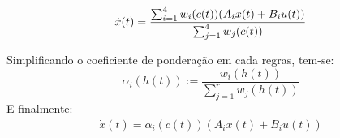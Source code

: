 \begin{align*}
	 \dot{x}(t) = \frac{\sum_{i=1}^{4}  w_i(c(t))(A_i  x(t) +  B_i  u(t))}{\sum_{j=1}^{4} w_j(c(t))} \vspace{0.5cm}
\end{align*}

Simplificando o coeficiente de ponderação em cada regras, tem-se:
\begin{equation*}
	\alpha_i (h(t)) := \frac{w_i(h(t))}{\sum_{j=1}^{r}w_j(h(t))}
\end{equation*}
E finalmente:
\begin{align} \label{eqModTakSug}
	 \dot{x}(t) = \alpha_i (c(t))(A_i  x(t) +  B_i  u(t))
\end{align}

%

